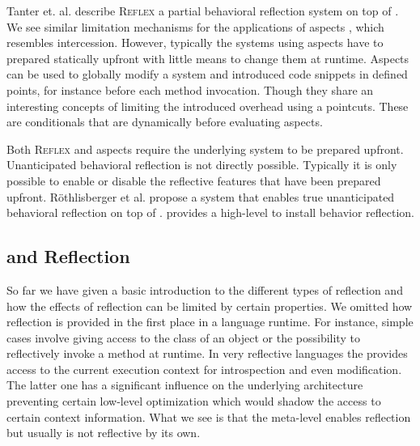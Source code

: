 \noindent Tanter et. al. describe \textsc{Reflex} \cite{Tant03a} a partial behavioral reflection system on top of \Java.
We see similar limitation mechanisms for the applications of aspects \cite{Kicz01a}, which resembles intercession.
However, typically the systems using aspects have to prepared statically upfront with little means to change them at runtime.
Aspects can be used to globally modify a system and introduced code snippets in defined points, for instance before each method invocation.
Though they share an interesting concepts of limiting the introduced overhead using a pointcuts.
These are conditionals that are dynamically before evaluating aspects.

Both \textsc{Reflex} and aspects require the underlying system to be prepared upfront.
Unanticipated behavioral reflection is not directly possible.
Typically it is only possible to enable or disable the reflective features that have been prepared upfront.
Röthlisberger et al. propose \Gepetto a system \cite{Roet07b} that enables true unanticipated behavioral reflection on top of \ST.
\Gepetto provides a high-level \API to install behavior reflection.

\subsection{\VMs and Reflection}

So far we have given a basic introduction to the different types of reflection and how the effects of reflection can be limited by certain properties.
We omitted how reflection is provided in the first place in a language runtime.
For instance, simple cases involve giving access to the class of an object or the possibility to reflectively invoke a method at runtime.
In very reflective languages the \VM provides access to the current execution context for introspection and even modification.
The latter one has a significant influence on the underlying \VM architecture preventing certain low-level optimization which would shadow the access to certain context information.
What we see is that the meta-level enables reflection but usually is not reflective by its own.

